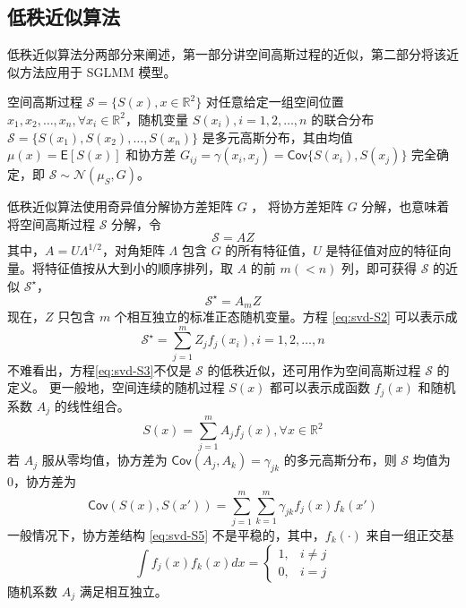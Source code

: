 \documentclass[12pt,a4paper,UTF8,twoside]{book}
\theoremstyle{definition}
\theoremstyle{definition}
\theoremstyle{definition}
\theoremstyle{remark}
\begin{document}
\hypertarget{LowRank}{%
\subsection{低秩近似算法}\label{LowRank}}

低秩近似算法分两部分来阐述，第一部分讲空间高斯过程的近似，第二部分将该近似方法应用于 SGLMM 模型。

空间高斯过程 \(\mathcal{S} = \{S(x),x\in\mathbb{R}^2\}\) 对任意给定一组空间位置 \(x_1,x_2,\ldots,x_n, \forall x_{i} \in \mathbb{R}^2\)，随机变量 \(S(x_i),i = 1,2,\ldots,n\) 的联合分布 \(\mathcal{S}=\{S(x_1),S(x_2),\ldots,S(x_n)\}\) 是多元高斯分布，其由均值 \(\mu(x) = \mathsf{E}[S(x)]\) 和协方差 \(G_{ij} =\gamma(x_i,x_j)= \mathsf{Cov}\{S(x_i),S(x_j)\}\) 完全确定，即 \(\mathcal{S} \sim \mathcal{N}(\mu_{S},G)\)。

低秩近似算法使用奇异值分解协方差矩阵 \(G\) \citep{Diggle2007}， 将协方差矩阵 \(G\) 分解，也意味着将空间高斯过程 \(\mathcal{S}\) 分解，令 \[\mathcal{S} = AZ\]
\noindent 其中，\(A = U\Lambda^{1/2}\)，对角矩阵 \(\Lambda\) 包含 \(G\) 的所有特征值，\(U\) 是特征值对应的特征向量。将特征值按从大到小的顺序排列，取 \(A\) 的前 \(m(<n)\) 列，即可获得 \(\mathcal{S}\) 的近似 \(\mathcal{S}^{\star}\)，
\begin{equation}
\mathcal{S}^{\star} = A_{m}Z \label{eq:svd-S2}
\end{equation}
\noindent 现在，\(Z\) 只包含 \(m\) 个相互独立的标准正态随机变量。方程 \eqref{eq:svd-S2} 可以表示成
\begin{equation}
\mathcal{S}^{\star} = \sum_{j=1}^{m}Z_{j}f_{j}(x_{i}), i = 1,2,\ldots,n \label{eq:svd-S3}
\end{equation}
\noindent 不难看出，方程\eqref{eq:svd-S3}不仅是 \(\mathcal{S}\) 的低秩近似，还可用作为空间高斯过程 \(\mathcal{S}\) 的定义。 更一般地，空间连续的随机过程 \(S(x)\) 都可以表示成函数 \(f_{j}(x)\) 和随机系数 \(A_{j}\) 的线性组合。
\begin{equation}
S(x) = \sum_{j=1}^{m}A_{j}f_{j}(x), \forall x \in \mathbb{R}^2 \label{eq:svd-S4}
\end{equation}
\noindent 若 \(A_j\) 服从零均值，协方差为 \(\mathsf{Cov}(A_{j},A_{k})=\gamma_{jk}\) 的多元高斯分布，则 \(\mathcal{S}\) 均值为0，协方差为
\begin{equation}
\mathsf{Cov}(S(x),S(x')) =  \sum_{j=1}^{m}\sum_{k=1}^{m}\gamma_{jk}f_{j}(x)f_{k}(x') \label{eq:svd-S5}
\end{equation}
\noindent 一般情况下，协方差结构 \eqref{eq:svd-S5} 不是平稳的，其中，\(f_{k}(\cdot)\) 来自一组正交基
\begin{equation*}
\int f_{j}(x)f_{k}(x)dx = 
\begin{cases}
1, & i \neq j \\
0, & i = j
\end{cases}
\end{equation*}
\noindent  随机系数 \(A_{j}\) 满足相互独立。
\end{document}
